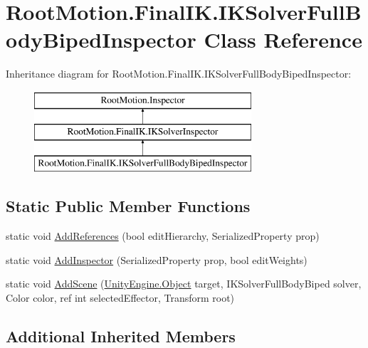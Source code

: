 \hypertarget{class_root_motion_1_1_final_i_k_1_1_i_k_solver_full_body_biped_inspector}{}\section{Root\+Motion.\+Final\+I\+K.\+I\+K\+Solver\+Full\+Body\+Biped\+Inspector Class Reference}
\label{class_root_motion_1_1_final_i_k_1_1_i_k_solver_full_body_biped_inspector}
Inheritance diagram for Root\+Motion.\+Final\+I\+K.\+I\+K\+Solver\+Full\+Body\+Biped\+Inspector\+:\begin{figure}[H]
\begin{center}
\leavevmode
\includegraphics[height=3.000000cm]{class_root_motion_1_1_final_i_k_1_1_i_k_solver_full_body_biped_inspector}
\end{center}
\end{figure}
\subsection*{Static Public Member Functions}
\begin{DoxyCompactItemize}
\item 
static void \mbox{\hyperlink{class_root_motion_1_1_final_i_k_1_1_i_k_solver_full_body_biped_inspector_a7f96f8cd357e6c133a873c44a2a2fae5}{Add\+References}} (bool edit\+Hierarchy, Serialized\+Property prop)
\item 
static void \mbox{\hyperlink{class_root_motion_1_1_final_i_k_1_1_i_k_solver_full_body_biped_inspector_a1ae5e59485518fc26bea2f3c48b730a3}{Add\+Inspector}} (Serialized\+Property prop, bool edit\+Weights)
\item 
static void \mbox{\hyperlink{class_root_motion_1_1_final_i_k_1_1_i_k_solver_full_body_biped_inspector_af1f17688b3fd698de2145a7480f75886}{Add\+Scene}} (\mbox{\hyperlink{_triangles_8cs_aef19bab18b9814edeef255c43e4f6bbc}{Unity\+Engine.\+Object}} target, I\+K\+Solver\+Full\+Body\+Biped solver, Color color, ref int selected\+Effector, Transform root)
\end{DoxyCompactItemize}
\subsection*{Additional Inherited Members}


